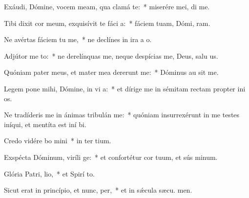 \item Exáudi, Dómine, vocem meam, qua clamá  te:~* miserére mei,  di me.
\item Tibi dixit cor meum, exquisívit te fáci a:~* fáciem tuam, Dómi, ram.
\item Ne avértas fáciem tu  me,~* ne declínes in ira a  o.
\item Adjútor me to:~* ne derelínquas me, neque despícias me, Deus, salu us.
\item Quóniam pater meus, et mater mea dererunt me:~* Dóminus au sit me.
\item Legem pone mihi, Dómine, in vi a:~* et dírige me in sémitam rectam propter ini os.
\item Ne tradíderis me in ánimas tribulán me:~* quóniam insurrexérunt in me testes iníqui, et mentíta est iní bi.
\item Credo vidére bo mini~* in ter tium.
\item Exspécta Dóminum, viríli ge:~* et confortétur cor tuum, et sús minum.
\item Glória Patri,  lio,~* et Spirí to.
\item Sicut erat in princípio, et nunc,  per,~* et in sǽcula sæcu. men.
